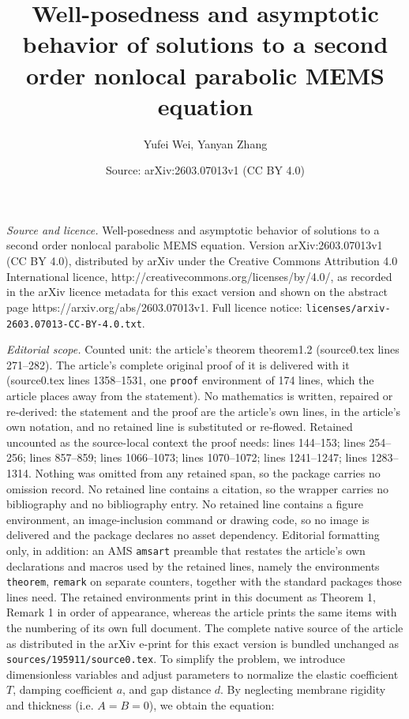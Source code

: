 \documentclass[10pt,a4paper]{amsart}
\title{Well-posedness and asymptotic behavior of solutions to a second order nonlocal parabolic MEMS equation}
\author{Yufei Wei, Yanyan Zhang}
\date{Source: arXiv:2603.07013v1 (CC BY 4.0)}
\begin{document}
\maketitle

\noindent\emph{Source and licence.} Well-posedness and asymptotic behavior of solutions to a second order nonlocal parabolic MEMS equation. Version arXiv:2603.07013v1 (CC BY 4.0), distributed by arXiv under the Creative Commons Attribution 4.0 International licence, http://creativecommons.org/licenses/by/4.0/, as recorded in the arXiv licence metadata for this exact version and shown on the abstract page https://arxiv.org/abs/2603.07013v1. Full licence notice: \texttt{licenses/arxiv-2603.07013-CC-BY-4.0.txt}.\par\smallskip

\noindent\textit{Editorial scope.} Counted unit: the article's theorem theorem1.2 (source0.tex lines 271--282). The article's complete original proof of it is delivered with it (source0.tex lines 1358--1531, one \texttt{proof} environment of 174 lines, which the article places away from the statement). No mathematics is written, repaired or re-derived: the statement and the proof are the article's own lines, in the article's own notation, and no retained line is substituted or re-flowed.  Retained uncounted as the source-local context the proof needs: lines 144--153; lines 254--256; lines 857--859; lines 1066--1073; lines 1070--1072; lines 1241--1247; lines 1283--1314.  Nothing was omitted from any retained span, so the package carries no omission record.  No retained line contains a citation, so the wrapper carries no bibliography and no bibliography entry.  No retained line contains a figure environment, an image-inclusion command or drawing code, so no image is delivered and the package declares no asset dependency.  Editorial formatting only, in addition: an AMS \texttt{amsart} preamble that restates the article's own declarations and macros used by the retained lines, namely the environments \texttt{theorem}, \texttt{remark} on separate counters, together with the standard packages those lines need.  The retained environments print in this document as Theorem 1, Remark 1 in order of appearance, whereas the article prints the same items with the numbering of its own full document.  The complete native source of the article as distributed in the arXiv e-print for this exact version is bundled unchanged as \texttt{sources/195911/source0.tex}.
To simplify the problem, we introduce dimensionless variables and adjust parameters to normalize the elastic coefficient $T$, damping coefficient $a$, and gap distance $d$. By neglecting membrane rigidity and thickness (i.e. $A = B = 0$), we obtain the equation:
\end{document}
